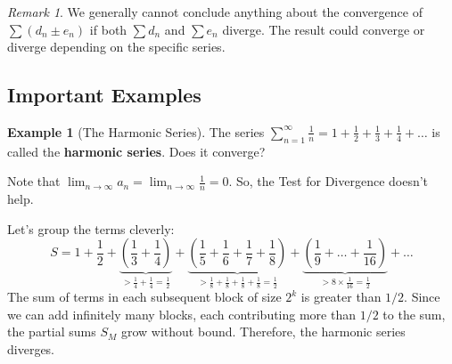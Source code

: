 \documentclass[11pt]{article}
\theoremstyle{definition}
\newtheorem{example}[theorem]{Example}
\theoremstyle{remark}
\newtheorem{remark}[theorem]{Remark}
\begin{document}
\begin{remark}
We generally cannot conclude anything about the convergence of $\sum (d_n \pm e_n)$ if both $\sum d_n$ and $\sum e_n$ diverge. The result could converge or diverge depending on the specific series.
\end{remark}

\subsection{Important Examples}

\begin{example}[The Harmonic Series] \label{ex:harmonic}
The series $\sum_{n=1}^\infty \frac{1}{n} = 1 + \frac{1}{2} + \frac{1}{3} + \frac{1}{4} + \dots$ is called the \textbf{harmonic series}. Does it converge?

Note that $\lim_{n\to\infty} a_n = \lim_{n\to\infty} \frac{1}{n} = 0$. So, the Test for Divergence doesn't help.

Let's group the terms cleverly:
\[ S = 1 + \frac{1}{2} + \underbrace{\left(\frac{1}{3} + \frac{1}{4}\right)}_{> \frac{1}{4}+\frac{1}{4} = \frac{1}{2}} + \underbrace{\left(\frac{1}{5} + \frac{1}{6} + \frac{1}{7} + \frac{1}{8}\right)}_{> \frac{1}{8}+\frac{1}{8}+\frac{1}{8}+\frac{1}{8} = \frac{1}{2}} + \underbrace{\left(\frac{1}{9} + \dots + \frac{1}{16}\right)}_{> 8 \times \frac{1}{16} = \frac{1}{2}} + \dots \]
The sum of terms in each subsequent block of size $2^k$ is greater than $1/2$. Since we can add infinitely many blocks, each contributing more than $1/2$ to the sum, the partial sums $S_M$ grow without bound.
Therefore, the harmonic series diverges.
\end{example}
\end{document}
